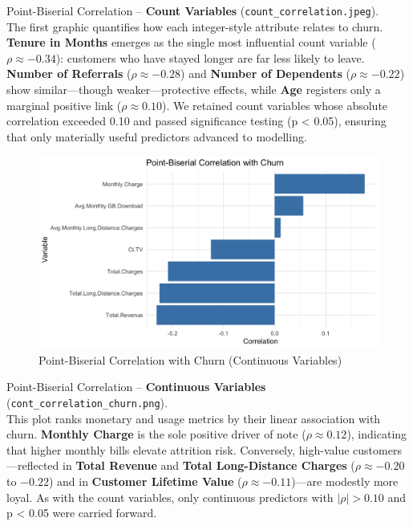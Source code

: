 \documentclass[
]{article}
\begin{document}
Point-Biserial Correlation -- \textbf{Count Variables}
(\texttt{count\_correlation.jpeg}).\\
The first graphic quantifies how each integer-style attribute relates to
churn. \textbf{Tenure in Months} emerges as the single most influential
count variable (\(\rho \approx -0.34\)): customers who have stayed
longer are far less likely to leave. \textbf{Number of Referrals}
(\(\rho \approx -0.28\)) and \textbf{Number of Dependents}
(\(\rho \approx -0.22\)) show similar---though weaker---protective
effects, while \textbf{Age} registers only a marginal positive link
(\(\rho \approx 0.10\)). We retained count variables whose absolute
correlation exceeded 0.10 and passed significance testing (p \textless{}
0.05), ensuring that only materially useful predictors advanced to
modelling.

\begin{figure}

{\centering \includegraphics[width=0.85\linewidth]{glm_gam_plots/cont_correlation_churn} 

}

\caption{Point-Biserial Correlation with Churn (Continuous Variables)}\label{fig:cont-corr-img}
\end{figure}

Point-Biserial Correlation -- \textbf{Continuous Variables}
(\texttt{cont\_correlation\_churn.png}).\\
This plot ranks monetary and usage metrics by their linear association
with churn. \textbf{Monthly Charge} is the sole positive driver of note
(\(\rho \approx 0.12\)), indicating that higher monthly bills elevate
attrition risk. Conversely, high-value customers---reflected in
\textbf{Total Revenue} and \textbf{Total Long-Distance Charges}
(\(\rho \approx -0.20\) to \(-0.22\)) and in \textbf{Customer Lifetime
Value} (\(\rho \approx -0.11\))---are modestly more loyal. As with the
count variables, only continuous predictors with \(|\rho| > 0.10\) and p
\textless{} 0.05 were carried forward.
\end{document}

